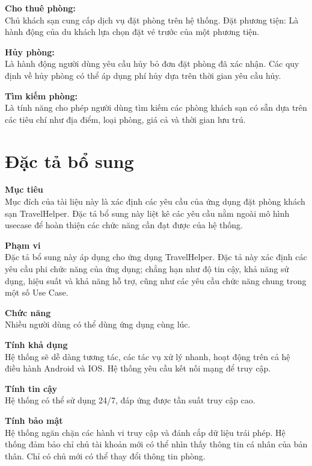 \textbf{Cho thuê phòng: }\\
\indent Chủ khách sạn cung cấp dịch vụ đặt phòng trên hệ thống.
Đặt phương tiện: Là hành động của du khách lựa chọn đặt vé trước của một phương tiện.

\textbf{Hủy phòng: }\\
\indent Là hành động người dùng yêu cầu hủy bỏ đơn đặt phòng đã xác nhận. Các quy định về hủy phòng có thể áp dụng phí hủy dựa trên thời gian yêu cầu hủy.

\textbf{Tìm kiếm phòng: }\\
\indent Là tính năng cho phép người dùng tìm kiếm các phòng khách sạn có sẵn dựa trên các tiêu chí như địa điểm, loại phòng, giá cả và thời gian lưu trú.

\section{Đặc tả bổ sung}
\textbf{\indent Mục tiêu}\\
\indent Mục đích của tài liệu này là xác định các yêu cầu của ứng dụng đặt phòng khách sạn TravelHelper. Đặc tả bổ sung này liệt kê các yêu cầu nằm ngoài mô hình usecase để hoàn thiện các chức năng cần đạt được của hệ thống.

\textbf{Phạm vi}\\
\indent Đặc tả bổ sung này áp dụng cho ứng dụng TravelHelper. Đặc tả này xác định các yêu cầu phi chức năng của ứng dụng; chẳng hạn như độ tin cậy, khả năng sử dụng, hiệu suất và khả năng hỗ trợ, cũng như các yêu cầu chức năng chung trong một số Use Case.

\textbf{Chức năng}\\
\indent Nhiều người dùng có thể dùng ứng dụng cùng lúc. 

\textbf{Tính khả dụng}\\
\indent Hệ thống sẽ dễ dàng tương tác, các tác vụ xử lý nhanh, hoạt động trên cả hệ điều hành Android và IOS. Hệ thống yêu cầu kết nối mạng để truy cập.

\textbf{Tính tin cậy}\\
\indent Hệ thống có thể sử dụng 24/7, đáp ứng được tần suất truy cập cao.

\textbf{Tính bảo mật}\\
\indent Hệ thống ngăn chặn các hành vi truy cập và đánh cắp dữ liệu trái phép. Hệ thống đảm bảo chỉ chủ tài khoản mới có thể nhìn thấy thông tin cá nhân của bản thân. Chỉ có chủ mới có thể thay đổi thông tin phòng.

